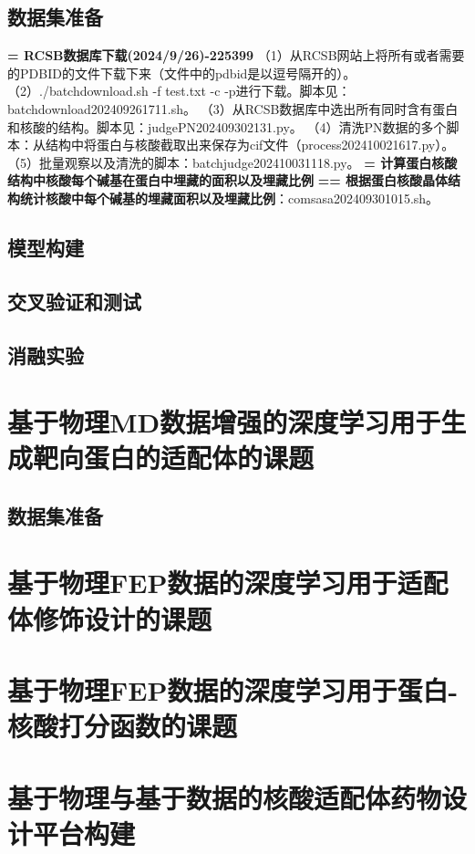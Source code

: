 \subsection{数据集准备}
\noindent \textbf{= RCSB数据库下载(2024/9/26)-225399}
\newline （1）从RCSB网站上将所有或者需要的PDBID的文件下载下来（文件中的pdbid是以逗号隔开的）。
（2）./batchdownload.sh -f test.txt -c -p进行下载。脚本见：batchdownload202409261711.sh。
（3）从RCSB数据库中选出所有同时含有蛋白和核酸的结构。脚本见：judgePN202409302131.py。
（4）清洗PN数据的多个脚本：从结构中将蛋白与核酸截取出来保存为cif文件（process202410021617.py）。
（5）批量观察以及清洗的脚本：batchjudge202410031118.py。
\newline \textbf{= 计算蛋白核酸结构中核酸每个碱基在蛋白中埋藏的面积以及埋藏比例}
\newline \textbf{== 根据蛋白核酸晶体结构统计核酸中每个碱基的埋藏面积以及埋藏比例}：comsasa202409301015.sh。

\subsection{模型构建}
\subsection{交叉验证和测试}
\subsection{消融实验}
\section{基于物理MD数据增强的深度学习用于生成靶向蛋白的适配体的课题}
\subsection{数据集准备}

\section{基于物理FEP数据的深度学习用于适配体修饰设计的课题}
\section{基于物理FEP数据的深度学习用于蛋白-核酸打分函数的课题}
\section{基于物理与基于数据的核酸适配体药物设计平台构建}
